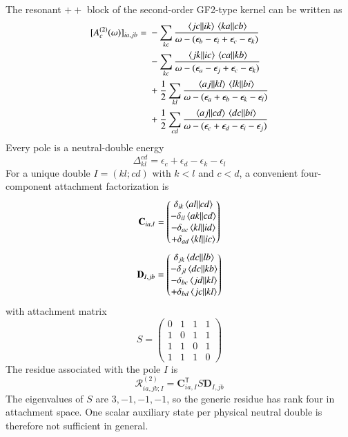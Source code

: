 \documentclass[aip,jcp,reprint,noshowkeys,superscriptaddress]{revtex4-1}
\newcommand{\eps}{\epsilon}
\begin{document}
The resonant $++$ block of the second-order GF2-type kernel can be written as
\begin{equation}
	\begin{split}
	[A_c^{(2)}(\omega)]_{ia,jb}
	={}&
	-
	\sum_{kc}
	\frac{
	\mel{jc}{}{ik}
	\mel{ka}{}{cb}
	}{
	\omega-(\eps_b-\eps_i+\eps_c-\eps_k)
	}
	\\
	&-
	\sum_{kc}
	\frac{
	\mel{jk}{}{ic}
	\mel{ca}{}{kb}
	}{
	\omega-(\eps_a-\eps_j+\eps_c-\eps_k)
	}
	\\
	&+
	\frac{1}{2}
	\sum_{kl}
	\frac{
	\mel{aj}{}{kl}
	\mel{lk}{}{bi}
	}{
	\omega-(\eps_a+\eps_b-\eps_k-\eps_l)
	}
	\\
	&+
	\frac{1}{2}
	\sum_{cd}
	\frac{
	\mel{aj}{}{cd}
	\mel{dc}{}{bi}
	}{
	\omega-(\eps_c+\eps_d-\eps_i-\eps_j)
	}
	\end{split}
	\label{eq:GF2_A}
\end{equation}
Every pole is a neutral-double energy
\begin{equation}
	\Delta_{kl}^{cd}
	=
	\eps_c+\eps_d-\eps_k-\eps_l
	\label{eq:Delta_double}
\end{equation}
For a unique double $I=(kl;cd)$ with $k<l$ and $c<d$, a convenient four-component attachment factorization is
\begin{equation}
	\mathbf C_{ia,I}
	=
	\begin{pmatrix}
	\delta_{ik}\mel{al}{}{cd}
	\\
	-\delta_{il}\mel{ak}{}{cd}
	\\
	-\delta_{ac}\mel{kl}{}{id}
	\\
	+\delta_{ad}\mel{kl}{}{ic}
	\end{pmatrix}
	\label{eq:C_attach}
\end{equation}
\begin{equation}
	\mathbf D_{I,jb}
	=
	\begin{pmatrix}
	\delta_{jk}\mel{dc}{}{lb}
	\\
	-\delta_{jl}\mel{dc}{}{kb}
	\\
	-\delta_{bc}\mel{jd}{}{kl}
	\\
	+\delta_{bd}\mel{jc}{}{kl}
	\end{pmatrix}
	\label{eq:D_attach}
\end{equation}
with attachment matrix
\begin{equation}
	S
	=
	\begin{pmatrix}
	0&1&1&1
	\\
	1&0&1&1
	\\
	1&1&0&1
	\\
	1&1&1&0
	\end{pmatrix}
	\label{eq:S_attach}
\end{equation}
The residue associated with the pole $I$ is
\begin{equation}
	\mathcal R^{(2)}_{ia,jb;I}
	=
	\mathbf C_{ia,I}^{\mathsf T}
	S
	\mathbf D_{I,jb}
	\label{eq:residue_attach}
\end{equation}
The eigenvalues of $S$ are $3,-1,-1,-1$, so the generic residue has rank four in attachment space.
One scalar auxiliary state per physical neutral double is therefore not sufficient in general.
\end{document}
